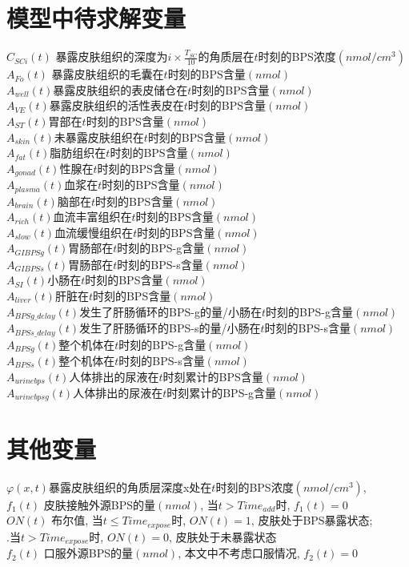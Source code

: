\documentclass[a4paper,punct=banjiao,twoside]{ctexrep}
\theoremstyle{plain}
\theoremstyle{definition}
\theoremstyle{remark}
\begin{document}
\section*{模型中待求解变量}
\label{app:B}
\noindent$C_{SCi}(t)$  {\hfill 暴露皮肤组织的深度为$i\times \frac{T_{SC}}{10}$的角质层在$t$时刻的BPS浓度$(nmol/cm^3)$}\\
$A_{Fo}(t)$ {\hfill  暴露皮肤组织的毛囊在$t$时刻的BPS含量$(nmol)$}\\
$A_{well}(t)${\hfill 暴露皮肤组织的表皮储仓在$t$时刻的BPS含量$(nmol)$}\\
$A_{VE}(t)${\hfill 暴露皮肤组织的活性表皮在$t$时刻的BPS含量$(nmol)$}\\
$A_{ST}(t)${\hfill 胃部在$t$时刻的BPS含量$(nmol)$}\\
$A_{skin}(t)${\hfill 未暴露皮肤组织在$t$时刻的BPS含量$(nmol)$}\\
$A_{fat}(t)${\hfill 脂肪组织在$t$时刻的BPS含量$(nmol)$}\\
$A_{gonad}(t)${\hfill 性腺在$t$时刻的BPS含量$(nmol)$}\\
$A_{plasma}(t)${\hfill 血浆在$t$时刻的BPS含量$(nmol)$}\\
$A_{brain}(t)${\hfill 脑部在$t$时刻的BPS含量$(nmol)$}\\
$A_{rich}(t)${\hfill 血流丰富组织在$t$时刻的BPS含量$(nmol)$}\\
$A_{slow}(t)${\hfill 血流缓慢组织在$t$时刻的BPS含量$(nmol)$}\\
$A_{GIBPSg}(t)${\hfill 胃肠部在$t$时刻的BPS-g含量$(nmol)$}\\
$A_{GIBPSs}(t)${\hfill 胃肠部在$t$时刻的BPS-s含量$(nmol)$}\\
$A_{SI}(t)${\hfill 小肠在$t$时刻的BPS含量$(nmol)$}\\
$A_{liver}(t)${\hfill 肝脏在$t$时刻的BPS含量$(nmol)$}\\
$A_{BPSg\_delay}(t)${\hfill 发生了肝肠循环的BPS-g的量/小肠在$t$时刻的BPS-g含量$(nmol)$}\\
$A_{BPSs\_delay}(t)${\hfill 发生了肝肠循环的BPS-s的量/小肠在$t$时刻的BPS-s含量$(nmol)$}\\
$A_{BPSg}(t)${\hfill 整个机体在$t$时刻的BPS-g含量$(nmol)$}\\
$A_{BPSs}(t)${\hfill 整个机体在$t$时刻的BPS-s含量$(nmol)$}\\
$A_{urinebps}(t)${\hfill 人体排出的尿液在$t$时刻累计的BPS含量$(nmol)$}\\
$A_{urinebpsg}(t)${\hfill  人体排出的尿液在$t$时刻累计的BPS-g含量$(nmol)$}
\section*{其他变量}
\noindent$\varphi(x,t)${\hfill   暴露皮肤组织的角质层深度x处在$t$时刻的BPS浓度$(nmol/cm^3)$,}\\
$f_1(t)$ {\hfill  皮肤接触外源BPS的量$(nmol)$, 当$t> Time_{add}$时, $f_1(t)=0$}\\
$ON(t)$ {\hfill  布尔值, 当$t\leq Time_{expose}$时, $ON(t)=1$, 皮肤处于BPS暴露状态;}\\ 
.\hfill 当$t> Time_{expose}$时, $ON(t)=0$, 皮肤处于未暴露状态\\
$f_2(t)$ {\hfill  口服外源BPS的量$(nmol)$, 本文中不考虑口服情况, $f_2(t)=0$}\\
\end{document}
